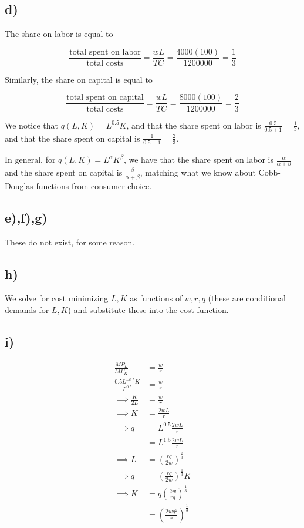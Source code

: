 \documentclass[12pt,letterpaper]{article}
\theoremstyle{definition}
\begin{document}
\subsection*{d)}

The share on labor is equal to

\[
  \frac{\text{total spent on labor}}{\text{total costs}} = \frac{wL}{TC} =
    \frac{4000(100)}{1200000} = \frac{1}{3}
\]

Similarly, the share on capital is equal to

\[
  \frac{\text{total spent on capital}}{\text{total costs}} = \frac{wL}{TC} =
  \frac{8000(100)}{1200000} = \frac{2}{3}
\]

We notice that $q(L,K) = L^{0.5}K$, and that the share spent on labor is
$\frac{0.5}{0.5+1} = \frac{1}{3}$, and that the share spent on capital is
$\frac{1}{0.5+1} = \frac{2}{3}$.

In general, for $q(L,K) = L^{\alpha}K^{\beta}$, we have that the share spent on
labor is $\frac{\alpha}{\alpha+\beta}$ and the share spent on capital is
$\frac{\beta}{\alpha+\beta}$, matching what we know about Cobb-Douglas functions
from consumer choice.

\subsection*{e),f),g)}

These do not exist, for some reason.

\subsection*{h)}

We solve for cost minimizing $L,K$ as functions of $w,r,q$ (these are
conditional demands for $L,K$) and substitute these into the cost function.

\subsection*{i)}

\begin{align*}
  \frac{MP_L}{MP_K} &= \frac{w}{r} \\
  \frac{0.5L^{-0.5}K}{L^{0.5}} &= \frac{w}{r} \\
  \implies \frac{K}{2L} &= \frac{w}{r} \\
  \implies K &= \frac{2wL}{r} \\
  \implies q &= L^{0.5}\frac{2wL}{r} \\
                    &= L^{1.5}\frac{2wL}{r} \\
  \implies L&= (\frac{rq}{2w})^{\frac{2}{3}} \\
  \implies q &= (\frac{rq}{2w})^{\frac{1}{3}} K \\
  \implies K &= q(\frac{2w}{rq})^{\frac{1}{3}} \\
                    &= (\frac{2wq^2}{r})^{\frac{1}{3}}
\end{align*}
\end{document}
